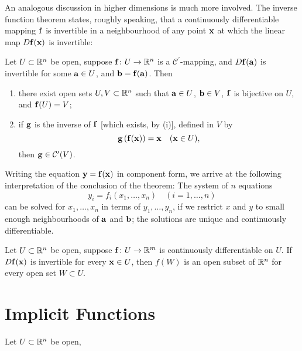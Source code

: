An analogous discussion in higher dimensions is much more involved. 
The inverse function theorem states, roughly speaking, that a continuously differentiable mapping $\vb{f}$ is invertible in a neighbourhood of any point $\vb{x}$ at which the linear map $D\vb{f}(\vb{x})$ is invertible:

\begin{theorem}
Let $U\subset\mathbb R^n$ be open, suppose $\vb{f}\colon U\to\mathbb R^n$ is a $\mathcal{C}^\prime$-mapping, and $D\vb{f}(\vb{a})$ is invertible for some $\vb{a}\in U$, and $\vb{b}=\vb{f}(\vb{a})$. Then
\begin{enumerate}[label=(\roman*)]
\item there exist open sets $U,V\subset\mathbb R^n$ such that $\vb{a}\in U$, $\vb{b}\in V$, $\vb{f}$ is bijective on $U$, and $\vb{f}(U)=V$;
\item if $\vb{g}$ is the inverse of $\vb{f}$ [which exists, by (i)], defined in $V$ by
\[\vb{g}\left(\vb{f}(\vb{x})\right)=\vb{x}\quad(\vb{x}\in U),\]
then $\vb{g}\in\mathcal{C}^\prime(V)$. 
\end{enumerate}
\end{theorem}

Writing the equation $\vb{y}=\vb{f}(\vb{x})$ in component form, we arrive at the following interpretation of the conclusion of the theorem: The system of $n$ equations
\[y_i=f_i(x_1,\dots,x_n)\quad(i=1,\dots,n)\]
can be solved for $x_1,\dots,x_n$ in terms of $y_1,\dots,y_n$, if we restrict $x$ and $y$ to small enough neighbourhoods of $\vb{a}$ and $\vb{b}$; the solutions are unique and continuously differentiable.

\begin{corollary}
Let $U\subset\mathbb R^n$ be open, suppose $\vb{f}\colon U\to\mathbb R^m$ is continuously differentiable on $U$.
If $D\vb{f}(\vb{x})$ is invertible for every $\vb{x}\in U$, then $f(W)$ is an open subset of $\mathbb R^n$ for every open set $W\subset U$.
\end{corollary}
\pagebreak

\section{Implicit Functions}
\begin{theorem}
Let $U\subset\mathbb R^n$ be open, 
\end{theorem}

\pagebreak

